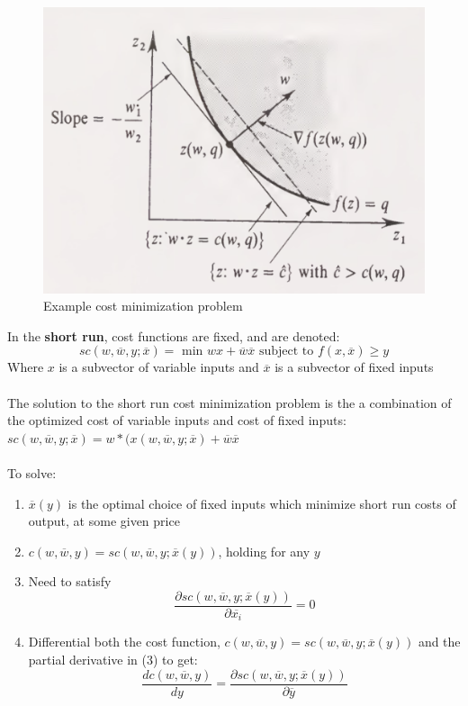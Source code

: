 \documentclass{article}
\begin{document}
\begin{figure}[H]
    \centering
    \includegraphics[width=0.5\linewidth]{images/cost-min-graph.png}
    \caption{Example cost minimization problem}
    \label{fig:cost-graph}
\end{figure}
In the \textbf{short run}, cost functions are fixed, and are denoted: 
    \[ sc(w, \overline{w}, y; \overline{x}) = \text{ min } wx + \overline{w}\overline{x} \text{ subject to } f(x, \overline{x}) \geq y \]
Where $x$ is a subvector of variable inputs and $\overline{x}$ is a subvector of fixed inputs  \\
\\
The solution to the short run cost minimization problem is the a combination of the optimized cost of variable inputs and cost of fixed inputs: $sc(w, \overline{w}, y; \overline{x}) = w*(x(w, \overline{w}, y; \overline{x}) + \overline{w}\overline{x}$ \\ 
\\ 
To solve: 
\begin{enumerate}
    \item $\overline{x}(y)$ is the optimal choice of fixed inputs which minimize short run costs of output, at some given price
    \item $c(w, \overline{w}, y) = sc(w, \overline{w}, y; \overline{x}(y))$, holding for any $y$
    \item Need to satisfy \[
    \frac{\partial sc(w, \overline{w}, y; \overline{x}(y))}{\partial \overline{x_i}} = 0
    \]
    \item Differential both the cost function, $c(w, \overline{w}, y) = sc(w, \overline{w}, y; \overline{x}(y))$ and the partial derivative in (3) to get: \[
    \frac{dc(w, \overline{w}, y)}{dy} =  \frac{\partial sc(w, \overline{w}, y; \overline{x}(y))}{\partial \overline{y}}
    \]
\end{enumerate}
\end{document}
